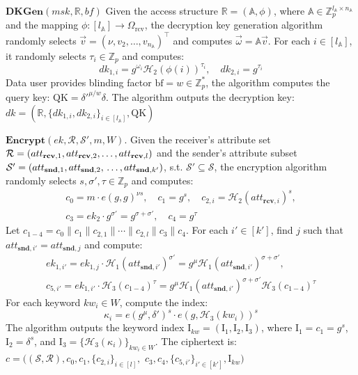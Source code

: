 \documentclass[runningheads]{llncs}
\begin{document}
$\mathbf{DKGen}(msk, \mathbb{R}, bf)$
Given the access structure $ \mathbb{R} = (\mathbb{A}, \phi) $, where $ \mathbb{A} \in \mathbb{Z}_p^{l_\mathbb{A} \times n_\mathbb{A}} $ and the mapping $ \phi: [l_\mathbb{A}] \rightarrow \Omega_{\text{rcv}} $, the decryption key generation algorithm randomly selects $ \vec{v} = (\nu, v_2, \ldots, v_{n_\mathbb{A}})^\top $ and computes $ \vec{\omega} = \mathbb{A} \vec{v} $. For each $ i \in [l_\mathbb{A}] $, it randomly selects $ \tau_i \in \mathbb{Z}_p $ and computes:
$$
dk_{1,i} = g^{\omega_i} \mathcal{H}_2(\phi(i))^{\tau_i}, \quad dk_{2,i} = g^{\tau_i}
$$
Data user provides blinding factor $ \text{bf} = w \in \mathbb{Z}_p^* $, the algorithm computes the query key: $\text{QK} = \delta'^{\mu/w} \delta$. The algorithm outputs the decryption key: $dk = (\mathbb{R}, \{ dk_{1,i}, dk_{2,i} \}_{i \in [l_\mathbb{A}]}, \text{QK})$

$\mathbf{Encrypt}(ek, \mathcal{R}, \mathcal{S}', m, W).$ Given the receiver's attribute set $ \mathcal{R} = (att_{\mathbf{rcv},1}, \\ att_{\mathbf{rcv},2},\ldots, att_{\mathbf{rcv},l}) $ and the sender's attribute subset $\mathcal{S}'=(att_{\mathbf{snd},1}, att_{\mathbf{snd},2}, \\ \ldots, att_{\mathbf{snd},k^{\prime}})$, s.t. $ \mathcal{S}' \subseteq \mathcal{S} $, the encryption algorithm randomly selects $ s, \sigma', \tau \in \mathbb{Z}_p $ and computes:
\begin{gather*}
c_0 = m \cdot e(g, g)^{\nu s}, \quad c_1 = g^s, \quad c_{2,i} = \mathcal{H}_2(att_{\mathbf{rcv},i})^s,\\
c_3 = ek_2 \cdot g^{\sigma'} = g^{\sigma + \sigma'}, \quad c_4 = g^\tau
\end{gather*}
Let $ c_{1-4} = c_0 \| c_1 \| c_{2,1} \| \cdots \| c_{2,l} \| c_3 \| c_4 $. For each $ i' \in [k'] $, find $j$ such that $ att_{\mathbf{snd},i'} = att_{\mathbf{snd},j} $ and compute:
\begin{gather*}
ek_{1,i'} = ek_{1,j} \cdot \mathcal{H}_1(att_{\mathbf{snd},i'})^{\sigma'} = g^\mu \mathcal{H}_1(att_{\mathbf{snd},i'})^{\sigma + \sigma'},\\
c_{5,i'} = ek_{1,i'} \cdot \mathcal{H}_3(c_{1-4})^\tau = g^\mu \mathcal{H}_1(att_{\mathbf{snd},i'})^{\sigma + \sigma'} \mathcal{H}_3(c_{1-4})^\tau
\end{gather*}
For each keyword $ kw_i \in W $, compute the index: 
$$\kappa_i = e(g^\mu, \delta')^s \cdot e(g, \mathcal{H}_3(kw_i))^s$$
The algorithm outputs the keyword index $ \text{I}_{kw} = (\text{I}_1, \text{I}_2, \text{I}_3) $, where $ \text{I}_1 = c_1 = g^s $, $ \text{I}_2 = \delta^s $, and $ \text{I}_3 = \{ \mathcal{H}_3(\kappa_i) \}_{kw_i \in W} $. The ciphertext is:
$c = ((\mathcal{S}, \mathcal{R}), c_0, c_1, \{ c_{2,i} \}_{i \in [l]},$ $ c_3, c_4, \{ c_{5,i'} \}_{i' \in [k']}, \text{I}_{kw})$
\end{document}
